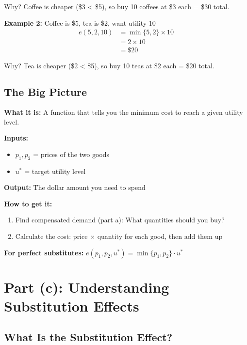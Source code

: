 \documentclass[11pt]{article}
\begin{document}
Why? Coffee is cheaper (\$3 < \$5), so buy 10 coffees at \$3 each = \$30 total.

\textbf{Example 2:} Coffee is \$5, tea is \$2, want utility 10
\begin{align*}
e(5, 2, 10) &= \min\{5, 2\} \times 10 \\
&= 2 \times 10 \\
&= \$20
\end{align*}

Why? Tea is cheaper (\$2 < \$5), so buy 10 teas at \$2 each = \$20 total.

\subsection{The Big Picture}

\begin{tcolorbox}[colback=green!5!white,colframe=green!75!black,title=Understanding the Expenditure Function]
\textbf{What it is:} A function that tells you the minimum cost to reach a given utility level.

\textbf{Inputs:}
\begin{itemize}
\item $p_1, p_2$ = prices of the two goods
\item $u^*$ = target utility level
\end{itemize}

\textbf{Output:} The dollar amount you need to spend

\textbf{How to get it:}
\begin{enumerate}
\item Find compensated demand (part a): What quantities should you buy?
\item Calculate the cost: price $\times$ quantity for each good, then add them up
\end{enumerate}

\textbf{For perfect substitutes:} $e(p_1, p_2, u^*) = \min\{p_1, p_2\} \cdot u^*$
\end{tcolorbox}

\section{Part (c): Understanding Substitution Effects}

\subsection{What Is the Substitution Effect?}
\end{document}
